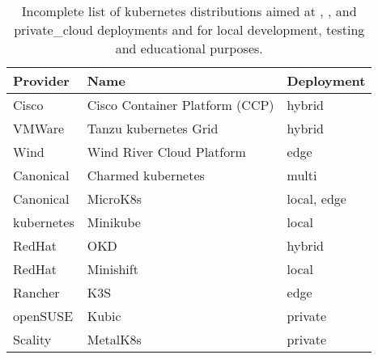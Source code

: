 \documentclass[../main.tex]{subfiles}
\begin{document}
    \begin{table}[h]
        \centering
        \begin{tabular}{ l  l  l }
            \toprule
            \textbf{Provider} & \textbf{Name} & \textbf{Deployment} \\ \midrule
            Cisco & Cisco Container Platform (CCP) & hybrid \\ \midrule
            VMWare & Tanzu \gls{kubernetes} Grid & hybrid \\ \midrule
            Wind & Wind River Cloud Platform & edge \\ \midrule
            Canonical & Charmed \gls{kubernetes} & multi \\ \midrule
            Canonical & MicroK8s & local, edge \\ \midrule
            \gls{kubernetes} & Minikube & local \\ \midrule
            RedHat & OKD & hybrid \\ \midrule
            RedHat & Minishift & local \\ \midrule
            Rancher & K3S & edge \\ \midrule
            openSUSE & Kubic & private \\ \midrule
            Scality & MetalK8s & private \\
            \bottomrule
        \end{tabular}
        \captionsetup{justification=centering}
        \caption{
            Incomplete list of \gls{kubernetes} distributions aimed at , ,  and \gls{private_cloud} deployments and for local development, testing and educational purposes.\cite{k8s_dist_cisco_ccp,k8s_dist_tanzu,k8s_dist_wind_rcp,k8s_dist_charmed,k8s_dist_micro,k8s_dist_minikube,k8s_dist_okd,k8s_dist_minishift,k8s_dist_k3s,k8s_dist_kubic,k8s_dist_metalk8s}
        }
        \label{tab:k8s_distros}
    \end{table}
\end{document}
